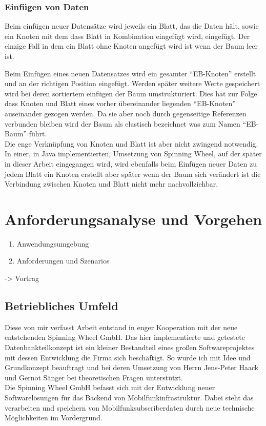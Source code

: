 \documentclass[a4paper,11pt,oneside,%
headsepline,												%
footsepline,												%
bibtotocnumbered									%
]{scrreprt}
\begin{document}
\subsection{Einfügen von Daten}
Beim einfügen neuer Datensätze wird jeweils ein Blatt, das die Daten hält, sowie ein Knoten mit dem dass Blatt in Kombination eingefügt wird, eingefügt. Der einzige Fall in dem ein Blatt ohne Knoten angefügt wird ist wenn der Baum leer ist.

Beim Einfügen eines neuen Datensatzes wird ein gesamter \enquote{EB-Knoten} erstellt und an der richtigen Position eingefügt. Werden später weitere Werte gespeichert wird bei deren sortiertem einfügen der Baum umstrukturiert. Dies hat zur Folge dass Knoten und Blatt eines vorher übereinander liegenden \enquote{EB-Knoten} auseinander gezogen werden. Da sie aber noch durch gegenseitige Referenzen verbunden bleiben wird der Baum als elastisch bezeichnet was zum Namen \enquote{\ac{EB-Baum}} führt.\\
Die enge Verknüpfung von Knoten und Blatt ist aber nicht zwingend notwendig. In einer, in Java implementierten, Umsetzung von Spinning Wheel, auf der später in dieser Arbeit eingegangen wird, wird ebenfalls beim Einfügen neuer Daten zu jedem Blatt ein Knoten erstellt aber später wenn der Baum sich verändert ist die Verbindung zwischen Knoten und Blatt nicht mehr nachvollziehbar.


 
\chapter{Anforderungsanalyse und Vorgehen}
\begin{enumerate}[1.]
			\item Anwendungsumgebung
			\item Anforderungen und Szenarios
		\end{enumerate}
-> Vortrag

\section{Betriebliches Umfeld}
Diese von mir verfasst Arbeit entstand in enger Kooperation mit der neue entstehenden Spinning Wheel GmbH. Das hier implementierte und getestete Datenbankteilkonzept ist ein kleiner Bestandteil eines großen Softwareprojektes mit dessen Entwicklung die Firma sich beschäftigt. So wurde ich mit Idee und Grundkonzept beauftragt und bei deren Umsetzung von Herrn Jens-Peter Haack und Gernot Sänger bei theoretischen Fragen unterstützt.\\
Die Spinning Wheel GmbH befasst sich mit der Entwicklung neuer Softwarelösungen für das Backend von Mobilfunkinfrastruktur. Dabei steht das verarbeiten und speichern von Mobilfunksubscriberdaten durch neue technische Möglichkeiten im Vordergrund.
\end{document}
